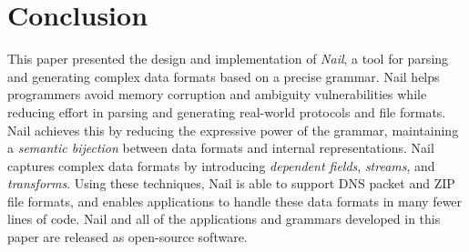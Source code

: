 \section{Conclusion}
\label{s:concl}

This paper presented the design and implementation of \textit{Nail},
a tool for parsing and generating complex data formats based on a
precise grammar.  Nail helps programmers avoid
memory corruption and ambiguity vulnerabilities while reducing effort
in parsing and generating real-world protocols and file formats.
Nail achieves this by reducing the expressive power of the grammar,
maintaining a \emph{semantic bijection} between data formats and internal
representations.  Nail captures complex data formats by introducing
\emph{dependent fields}, \emph{streams}, and \emph{transforms}.
Using these techniques, Nail is able to support DNS packet and ZIP file
formats, and enables applications to handle these data formats in many
fewer lines of code.
Nail and all of the applications and grammars developed in this paper
are released as open-source software.


